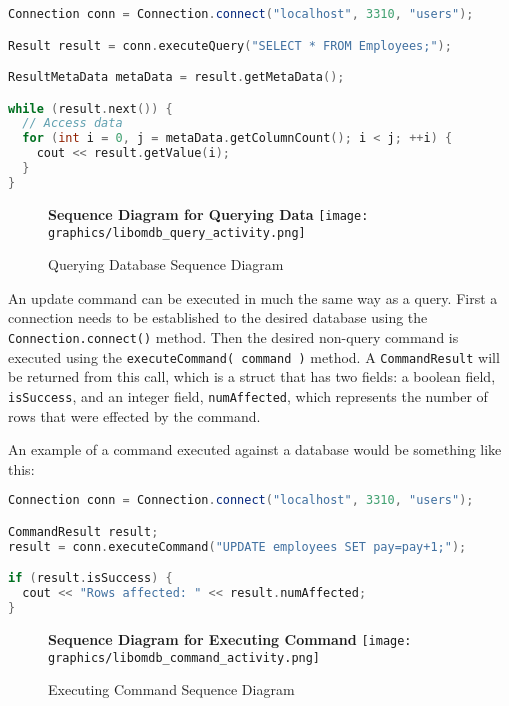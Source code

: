 \documentclass[letterpaper, 12pt]{article}
\begin{document}
  \begin{lstlisting}[language=C++]
Connection conn = Connection.connect("localhost", 3310, "users");

Result result = conn.executeQuery("SELECT * FROM Employees;");

ResultMetaData metaData = result.getMetaData();

while (result.next()) {
  // Access data
  for (int i = 0, j = metaData.getColumnCount(); i < j; ++i) {
    cout << result.getValue(i);
  }
}
  \end{lstlisting}
  \par\vspace{\baselineskip}

  \begin{figure}
    \centering
    \textbf{Sequence Diagram for Querying Data}
    \texttt{[image: graphics/libomdb\_query\_activity.png]}
    \caption{Querying Database Sequence Diagram}
  \end{figure}
  \par\vspace{\baselineskip}

  An update command can be executed in much the same way as a query. First
  a connection needs to be established to the desired database using the
  \lstinline|Connection.connect()| method. Then the desired non-query
  command is executed using the \lstinline|executeCommand( command )| method.
  A \lstinline|CommandResult| will be returned from this call,
  which is a struct that has two fields: a boolean field,
  \lstinline|isSuccess|, and an integer field,
  \lstinline|numAffected|, which represents the number of rows
  that were effected by the command.
  \par\vspace{\baselineskip}
  An example of a command executed against a database would be something like this:
  \begin{lstlisting}[language=C++]
Connection conn = Connection.connect("localhost", 3310, "users");

CommandResult result;
result = conn.executeCommand("UPDATE employees SET pay=pay+1;");

if (result.isSuccess) {
  cout << "Rows affected: " << result.numAffected;
}
  \end{lstlisting}

  \begin{figure}
    \centering
    \textbf{Sequence Diagram for Executing Command}
    \texttt{[image: graphics/libomdb\_command\_activity.png]}
    \caption{Executing Command Sequence Diagram}
  \end{figure}
\end{document}
